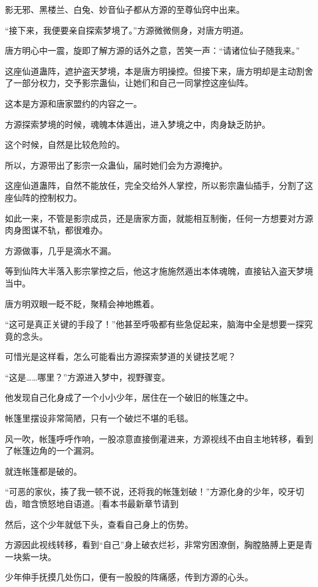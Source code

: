 
\begin{this_body}

影无邪、黑楼兰、白兔、妙音仙子都从方源的至尊仙窍中出来。

“接下来，我便要亲自探索梦境了。”方源微微侧身，对唐方明道。

唐方明心中一震，旋即了解方源的话外之意，苦笑一声：“请诸位仙子随我来。”

这座仙道蛊阵，遮护盗天梦境，本是唐方明操控。但接下来，唐方明却是主动割舍了一部分权力，交予影宗蛊仙，让她们和自己一同掌控这座仙阵。

这本是方源和唐家盟约的内容之一。

方源探索梦境的时候，魂魄本体遁出，进入梦境之中，肉身缺乏防护。

这个时候，自然是比较危险的。

所以，方源带出了影宗一众蛊仙，届时她们会为方源掩护。

这座仙道蛊阵，自然不能放任，完全交给外人掌控，所以影宗蛊仙插手，分割了这座仙阵的控制权力。

如此一来，不管是影宗成员，还是唐家方面，就能相互制衡，任何一方想要对方源肉身图谋不轨，都很难办。

方源做事，几乎是滴水不漏。

等到仙阵大半落入影宗掌控之后，他这才施施然遁出本体魂魄，直接钻入盗天梦境当中。

唐方明双眼一眨不眨，聚精会神地瞧着。

“这可是真正关键的手段了！”他甚至呼吸都有些急促起来，脑海中全是想要一探究竟的念头。

可惜光是这样看，怎么可能看出方源探索梦道的关键技艺呢？

“这是……哪里？”方源进入梦中，视野骤变。

他发现自己化身成了一个小小少年，居住在一个破旧的帐篷之中。

帐篷里摆设非常简陋，只有一个破烂不堪的毛毯。

风一吹，帐篷呼呼作响，一股凉意直接倒灌进来，方源视线不由自主地转移，看到了帐篷边角的一个漏洞。

就连帐篷都是破的。

“可恶的家伙，揍了我一顿不说，还将我的帐篷划破！”方源化身的少年，咬牙切齿，暗含愤怒地自语道。[看本书最新章节请到

然后，这个少年就低下头，查看自己身上的伤势。

方源因此视线转移，看到“自己”身上破衣烂衫，非常穷困潦倒，胸膛胳膊上更是青一块紫一块。

少年伸手抚摸几处伤口，便有一股股的阵痛感，传到方源的心头。


\end{this_body}

